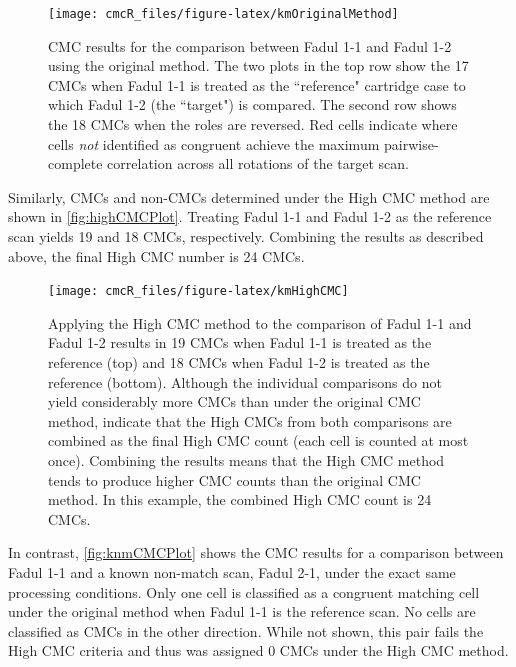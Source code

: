 \begin{Schunk}
\begin{figure}[htbp]

{\centering \texttt{[image: cmcR\_files/figure-latex/kmOriginalMethod]} 

}

\caption{\label{fig:topVoteCMCPlot} CMC results for the comparison between Fadul 1-1 and Fadul 1-2 using the original method. The two plots in the top row show the 17 CMCs when Fadul 1-1 is treated as the ``reference" cartridge case to which Fadul 1-2 (the ``target") is compared. The second row shows the 18 CMCs when the roles are reversed. Red cells indicate where cells \emph{not} identified as congruent achieve the maximum pairwise-complete correlation across all rotations of the target scan. }\label{fig:unnamed-chunk-16}
\end{figure}
\end{Schunk}

Similarly, CMCs and non-CMCs determined under the High CMC method are
shown in \autoref{fig:highCMCPlot}. Treating Fadul 1-1 and Fadul 1-2 as
the reference scan yields 19 and 18 CMCs, respectively. Combining the
results as described above, the final High CMC number is 24 CMCs.

\begin{Schunk}
\begin{figure}[htbp]

{\centering \texttt{[image: cmcR\_files/figure-latex/kmHighCMC]} 

}

\caption{\label{fig:highCMCPlot} Applying the High CMC method to the comparison of Fadul 1-1 and Fadul 1-2 results in 19 CMCs when Fadul 1-1 is treated as the reference (top) and 18 CMCs when Fadul 1-2 is treated as the reference (bottom). Although the individual comparisons do not yield considerably more CMCs than under the original CMC method, \citet{tong_improved_2015} indicate that the High CMCs from both comparisons are combined as the final High CMC count (each cell is counted at most once). Combining the results means that the High CMC method tends to produce higher CMC counts than the original CMC method. In this example, the combined High CMC count is 24 CMCs.}\label{fig:unnamed-chunk-17}
\end{figure}
\end{Schunk}

In contrast, \autoref{fig:knmCMCPlot} shows the CMC results for a
comparison between Fadul 1-1 and a known non-match scan, Fadul 2-1,
under the exact same processing conditions. Only one cell is classified
as a congruent matching cell under the original method when Fadul 1-1 is
the reference scan. No cells are classified as CMCs in the other
direction. While not shown, this pair fails the High CMC criteria and
thus was assigned 0 CMCs under the High CMC method.

